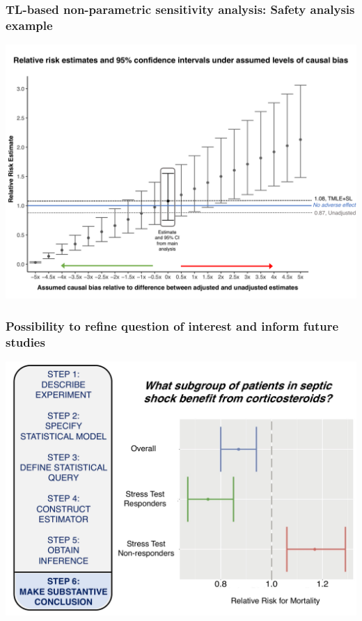 \documentclass[t]{beamer}
\begin{document}
\begin{frame}
\frametitle{TL-based non-parametric sensitivity analysis: Safety analysis example}

\vspace{-18pt}
  \begin{center}
  \includegraphics[width = 1.01\textwidth]{figures/sensitivityRR_greyscale.pdf}
  \end{center}
\end{frame}

\begin{frame}
  \frametitle{Possibility to refine question of interest and inform future studies}
  \vspace{-11pt}
  \begin{center}
  \includegraphics[width = 1.0\textwidth]{figures/roadmap_alt1.pdf}
  \end{center}
\end{frame}
\end{document}
